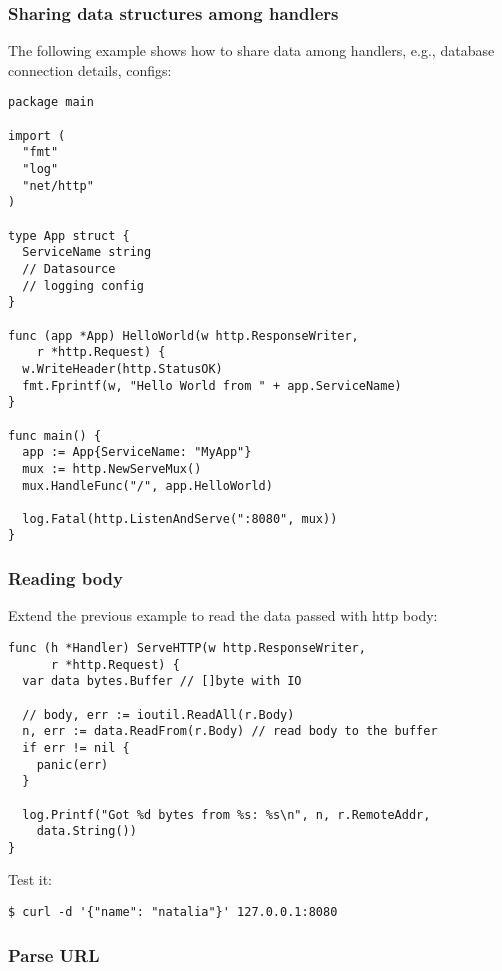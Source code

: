 \documentclass[11pt, letterpaper]{article}
\begin{document}
\subsubsection{Sharing data structures among handlers}

The following example shows how to share data among handlers, e.g., database connection details, configs:

\begin{verbatim}
package main

import (
  "fmt"
  "log"
  "net/http"
)

type App struct {
  ServiceName string
  // Datasource
  // logging config
}

func (app *App) HelloWorld(w http.ResponseWriter,
    r *http.Request) {
  w.WriteHeader(http.StatusOK)
  fmt.Fprintf(w, "Hello World from " + app.ServiceName)
}

func main() {
  app := App{ServiceName: "MyApp"}
  mux := http.NewServeMux()
  mux.HandleFunc("/", app.HelloWorld)

  log.Fatal(http.ListenAndServe(":8080", mux))
}
\end{verbatim}

\subsubsection{Reading body}

Extend the previous example to read the data passed with http body:

\begin{verbatim}
func (h *Handler) ServeHTTP(w http.ResponseWriter,
      r *http.Request) {
  var data bytes.Buffer // []byte with IO
  
  // body, err := ioutil.ReadAll(r.Body)
  n, err := data.ReadFrom(r.Body) // read body to the buffer
  if err != nil {  
    panic(err) 
  }

  log.Printf("Got %d bytes from %s: %s\n", n, r.RemoteAddr,
    data.String())
}
\end{verbatim}

Test it:

\begin{verbatim}
$ curl -d '{"name": "natalia"}' 127.0.0.1:8080 
\end{verbatim}


\subsubsection{Parse URL}
\end{document}
